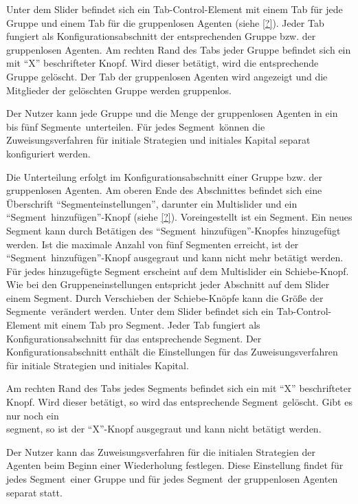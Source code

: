 \documentclass[parskip=full,11pt]{scrartcl}
\def\segment{Segment}
\def\segments{Segmente}
\begin{document}
Unter dem Slider befindet sich ein Tab-Control-Element mit einem Tab für jede Gruppe und einem Tab für die gruppenlosen Agenten (siehe \cref{?}). Jeder Tab fungiert als Konfigurationsabschnitt der entsprechenden Gruppe bzw. der gruppenlosen Agenten. Am rechten Rand des Tabs jeder Gruppe befindet sich ein mit \enquote{X} beschrifteter Knopf. Wird dieser betätigt, wird die entsprechende Gruppe gelöscht. Der Tab der gruppenlosen Agenten wird angezeigt und die Mitglieder der gelöschten Gruppe werden gruppenlos.

\functionality{Einteilung von Gruppen in \segments}{fnc:segments}
Der Nutzer kann jede Gruppe und die Menge der gruppenlosen Agenten in ein bis fünf \segments\ unterteilen. Für jedes \segment\ können die Zuweisungsverfahren für initiale Strategien und initiales Kapital separat konfiguriert werden.

Die Unterteilung erfolgt im Konfigurationsabschnitt einer Gruppe bzw. der gruppenlosen Agenten. Am oberen Ende des Abschnittes befindet sich eine Überschrift \enquote{\segment einstellungen}, darunter ein Multislider und ein \enquote{\segment\ hinzufügen}-Knopf (siehe \cref{?}). Voreingestellt ist ein Segment. Ein neues Segment kann durch Betätigen des \enquote{\segment\ hinzufügen}-Knopfes hinzugefügt werden. Ist die maximale Anzahl von fünf \segments n erreicht, ist der \enquote{\segment\ hinzufügen}-Knopf ausgegraut und kann nicht mehr betätigt werden. Für jedes hinzugefügte Segment erscheint auf dem Multislider ein Schiebe-Knopf. Wie bei den Gruppeneinstellungen entspricht jeder Abschnitt auf dem Slider einem \segment. Durch Verschieben der Schiebe-Knöpfe kann die Größe der \segments\ verändert werden. Unter dem Slider befindet sich ein Tab-Control-Element mit einem Tab pro \segment. Jeder Tab fungiert als Konfigurationsabschnitt für das entsprechende \segment. Der Konfigurationsabschnitt enthält die Einstellungen für das Zuweisungsverfahren für initiale Strategien und initiales Kapital.

Am rechten Rand des Tabs jedes \segment s befindet sich ein mit \enquote{X} beschrifteter Knopf. Wird dieser betätigt, so wird das entsprechende \segment\ gelöscht. Gibt es nur noch ein \\segment, so ist der \enquote{X}-Knopf ausgegraut und kann nicht betätigt werden.

Der Nutzer kann das Zuweisungsverfahren für die initialen Strategien der Agenten beim Beginn einer Wiederholung festlegen. Diese Einstellung findet für jedes \segment\ einer Gruppe und für jedes \segment\ der gruppenlosen Agenten separat statt.
\end{document}
